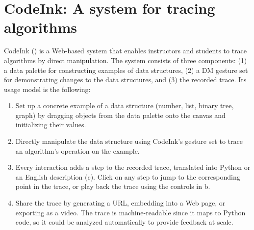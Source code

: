 

\section{CodeInk: A system for tracing algorithms}
CodeInk () is a Web-based system that enables
instructors and
students to trace algorithms by direct manipulation. The system consists of
three components: (1) a data palette for constructing examples of data
structures, (2) a DM gesture set for demonstrating changes to the data
structures, and (3) the recorded trace.
Its usage model is the following:

\begin{enumerate}\itemsep0pt

\item Set up a concrete example of a data structure (number, list, binary tree,
graph) by dragging objects from the data palette onto the canvas and
initializing their values.

\item Directly manipulate the data structure using CodeInk's gesture set
to trace an algorithm's operation on the example.

\item Every interaction adds a step to the recorded trace, translated into
Python or an English description (c). Click on any step to
jump to the corresponding point in the trace, or play back the trace using the
controls in b.

\item Share the trace by generating a URL, embedding into a Web page, or
exporting as a video. The trace is machine-readable since it maps to
Python code, so it could be analyzed automatically to provide feedback
at scale.

\end{enumerate}

